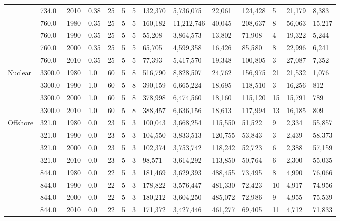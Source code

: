 \begin{table}[]
\begin{tabular}{|l|l|l|l|l|l|l|l|l|l|l|l|l|l|}
		& 734.0 & 2010 & 0.38 & 25 & 5 & 5 & 132,370 & 5,736,075 & 22,061 & 124,428 & 5 & 21,179 & 8,383 \\ \cline{2-14} 
		& 760.0 & 1980 & 0.35 & 25 & 5 & 5 & 160,182 & 11,212,746 & 40,045 & 208,637 & 8 & 56,063 & 15,217 \\ \cline{2-14} 
		& 760.0 & 1990 & 0.35 & 25 & 5 & 5 & 55,208 & 3,864,573 & 13,802 & 71,908 & 4 & 19,322 & 5,244 \\ \cline{2-14} 
		& 760.0 & 2000 & 0.35 & 25 & 5 & 5 & 65,705 & 4,599,358 & 16,426 & 85,580 & 8 & 22,996 & 6,241 \\ \cline{2-14} 
		& 760.0 & 2010 & 0.35 & 25 & 5 & 5 & 77,393 & 5,417,570 & 19,348 & 100,805 & 3 & 27,087 & 7,352 \\ \hline
		\multirow{4}{*}{Nuclear} & 3300.0 & 1980 & 1.0 & 60 & 5 & 8 & 516,790 & 8,828,507 & 24,762 & 156,975 & 21 & 21,532 & 1,076 \\ \cline{2-14} 
		& 3300.0 & 1990 & 1.0 & 60 & 5 & 8 & 390,159 & 6,665,224 & 18,695 & 118,510 & 3 & 16,256 & 812 \\ \cline{2-14} 
		& 3300.0 & 2000 & 1.0 & 60 & 5 & 8 & 378,998 & 6,474,560 & 18,160 & 115,120 & 15 & 15,791 & 789 \\ \cline{2-14} 
		& 3300.0 & 2010 & 1.0 & 60 & 5 & 8 & 388,457 & 6,636,156 & 18,613 & 117,994 & 13 & 16,185 & 809 \\ \hline
		\multirow{8}{*}{Offshore} & 321.0 & 1980 & 0.0 & 23 & 5 & 3 & 100,043 & 3,668,254 & 115,550 & 51,522 & 9 & 2,334 & 55,857 \\ \cline{2-14} 
		& 321.0 & 1990 & 0.0 & 23 & 5 & 3 & 104,550 & 3,833,513 & 120,755 & 53,843 & 3 & 2,439 & 58,373 \\ \cline{2-14} 
		& 321.0 & 2000 & 0.0 & 23 & 5 & 3 & 102,374 & 3,753,742 & 118,242 & 52,723 & 6 & 2,388 & 57,159 \\ \cline{2-14} 
		& 321.0 & 2010 & 0.0 & 23 & 5 & 3 & 98,571 & 3,614,292 & 113,850 & 50,764 & 6 & 2,300 & 55,035 \\ \cline{2-14} 
		& 844.0 & 1980 & 0.0 & 22 & 5 & 3 & 181,469 & 3,629,393 & 488,455 & 73,495 & 8 & 4,990 & 76,066 \\ \cline{2-14} 
		& 844.0 & 1990 & 0.0 & 22 & 5 & 3 & 178,822 & 3,576,447 & 481,330 & 72,423 & 10 & 4,917 & 74,956 \\ \cline{2-14} 
		& 844.0 & 2000 & 0.0 & 22 & 5 & 3 & 180,212 & 3,604,250 & 485,072 & 72,986 & 9 & 4,955 & 75,539 \\ \cline{2-14} 
		& 844.0 & 2010 & 0.0 & 22 & 5 & 3 & 171,372 & 3,427,446 & 461,277 & 69,405 & 11 & 4,712 & 71,833 \\ \hline

\end{tabular}
\end{table}
